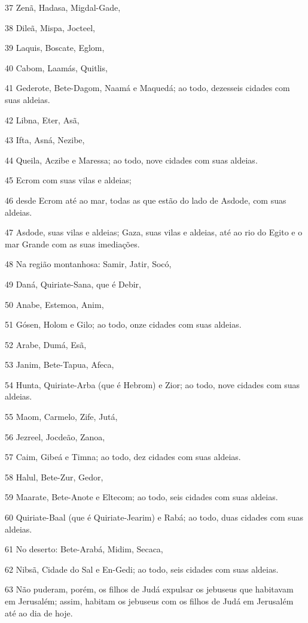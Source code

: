 \par 37 Zenã, Hadasa, Migdal-Gade,
\par 38 Dileã, Mispa, Jocteel,
\par 39 Laquis, Boscate, Eglom,
\par 40 Cabom, Laamás, Quitlis,
\par 41 Gederote, Bete-Dagom, Naamá e Maquedá; ao todo, dezesseis cidades com suas aldeias.
\par 42 Libna, Eter, Asã,
\par 43 Ifta, Asná, Nezibe,
\par 44 Queila, Aczibe e Maressa; ao todo, nove cidades com suas aldeias.
\par 45 Ecrom com suas vilas e aldeias;
\par 46 desde Ecrom até ao mar, todas as que estão do lado de Asdode, com suas aldeias.
\par 47 Asdode, suas vilas e aldeias; Gaza, suas vilas e aldeias, até ao rio do Egito e o mar Grande com as suas imediações.
\par 48 Na região montanhosa: Samir, Jatir, Socó,
\par 49 Daná, Quiriate-Sana, que é Debir,
\par 50 Anabe, Estemoa, Anim,
\par 51 Gósen, Holom e Gilo; ao todo, onze cidades com suas aldeias.
\par 52 Arabe, Dumá, Esã,
\par 53 Janim, Bete-Tapua, Afeca,
\par 54 Hunta, Quiriate-Arba (que é Hebrom) e Zior; ao todo, nove cidades com suas aldeias.
\par 55 Maom, Carmelo, Zife, Jutá,
\par 56 Jezreel, Jocdeão, Zanoa,
\par 57 Caim, Gibeá e Timna; ao todo, dez cidades com suas aldeias.
\par 58 Halul, Bete-Zur, Gedor,
\par 59 Maarate, Bete-Anote e Eltecom; ao todo, seis cidades com suas aldeias.
\par 60 Quiriate-Baal (que é Quiriate-Jearim) e Rabá; ao todo, duas cidades com suas aldeias.
\par 61 No deserto: Bete-Arabá, Midim, Secaca,
\par 62 Nibsã, Cidade do Sal e En-Gedi; ao todo, seis cidades com suas aldeias.
\par 63 Não puderam, porém, os filhos de Judá expulsar os jebuseus que habitavam em Jerusalém; assim, habitam os jebuseus com os filhos de Judá em Jerusalém até ao dia de hoje.

